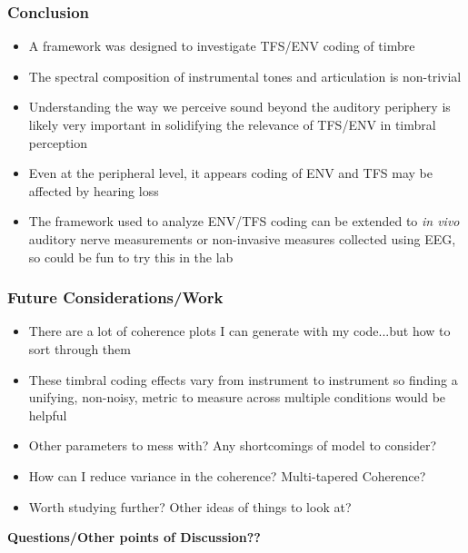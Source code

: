 \documentclass[aspectratio=1610]{beamer}
\begin{document}
\begin{frame}
\frametitle{Conclusion}
\begin{itemize}[label = $\blacktriangleright$]
\item A framework was designed to investigate TFS/ENV coding of timbre \vspace{.5em}
\item The spectral composition of instrumental tones and articulation is non-trivial
\vspace{.5em}
\item Understanding the way we perceive sound beyond the auditory periphery is likely very important in solidifying the relevance of TFS/ENV in timbral perception
\vspace{.5em}
\item Even at the peripheral level, it appears coding of ENV and TFS may be affected by hearing loss
\vspace{.5em}
\item The framework used to analyze ENV/TFS coding can be extended to \textit{in vivo} auditory nerve measurements or non-invasive measures collected using EEG, so could be fun to try this in the lab
\end{itemize}

\end{frame}


\begin{frame}

\frametitle{Future Considerations/Work}

\begin{itemize}[label = $\blacktriangleright$]
\item There are a lot of coherence plots I can generate with my code...but how to sort through them
\vspace{.5em}
\item These timbral coding effects vary from instrument to instrument so finding a unifying, non-noisy, metric to measure across multiple conditions would be helpful
\vspace{.5em}
\item Other parameters to mess with? Any shortcomings of model to consider?
\vspace{.5em}
\item How can I reduce variance in the coherence? Multi-tapered Coherence? 
\vspace{.5em}
\item Worth studying further? Other ideas of things to look at?
\end{itemize}

\centering
\vspace{2em}
\textbf{Questions/Other points of Discussion??}
\end{frame}
\end{document}

